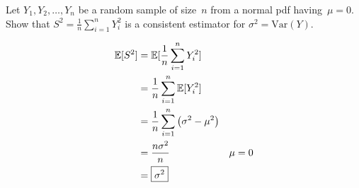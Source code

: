 \begin{problem}
  Let ${Y_1,Y_2,\ldots,Y_n}$ be a random sample of size~$n$ from a normal pdf having~${\mu = 0}$.  Show that ${S^2 = \frac{1}{n} \sum_{i=1}^{n} Y_{i}^2}$ is a consistent estimator for ${\sigma^{2} = \text{Var}(Y)}$.
\end{problem}

\begin{align}
  \mathbb{E}\lbrack S^2\rbrack &= \mathbb{E}\lbrack\frac{1}{n}\sum_{i=1}^{n} Y_{i}^{2}\rbrack \\
               &= \frac{1}{n} \sum_{i=1}^{n} \mathbb{E}\lbrack Y_{i}^{2}\rbrack \\
               &= \frac{1}{n} \sum_{i=1}^{n} \left( \sigma^2 - \mu^2 \right) \\
               &= \frac{n\sigma^{2}}{n} & \mu = 0\\
               &= \boxed{\sigma^2}
\end{align}
